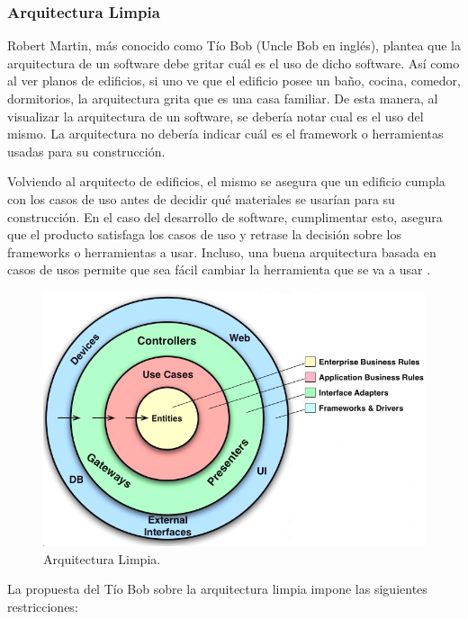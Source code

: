 \subsubsection{\textbf{Arquitectura Limpia}}
Robert Martin, más conocido como Tío Bob (Uncle Bob en inglés), plantea que la arquitectura de un software debe gritar cuál es el uso de dicho software. Así como al ver planos de edificios, si uno ve que el edificio posee un baño, cocina, comedor, dormitorios, la arquitectura grita que es una casa familiar. De esta manera, al visualizar la arquitectura de un software, se debería notar cual es el uso del mismo. La arquitectura no debería indicar cuál es el framework o herramientas usadas para su construcción.

Volviendo al arquitecto de edificios, el mismo se asegura que un edificio cumpla con los casos de uso antes de decidir qué materiales se usarían para su construcción. En el caso del desarrollo de software, cumplimentar esto, asegura que el producto satisfaga los casos de uso y retrase la decisión sobre los frameworks o herramientas a usar. Incluso, una buena arquitectura basada en casos de usos permite que sea fácil cambiar la herramienta que se va a usar .

\begin{figure}[h]
\centering%
\includegraphics[width=\textwidth,keepaspectratio=true]{contextualizacion/MarcoReferencial/imgs/clean_architecture.png}%
\caption{Arquitectura Limpia.} \label{fig:clean_architecture}
\end{figure}


La propuesta del Tío Bob sobre la arquitectura limpia impone las siguientes restricciones:\\

